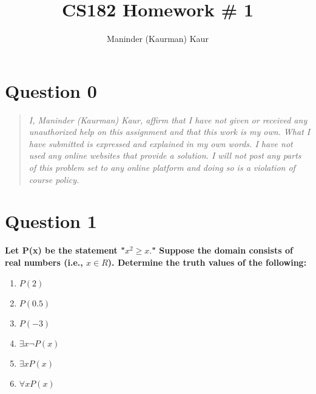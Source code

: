 \documentclass[11pt]{article}
\title{CS182 Homework \# 1}
\author{Maninder (Kaurman) Kaur}
\begin{document}
\maketitle

\section*{Question 0}
\begin{quote}
    \textit{I, Maninder (Kaurman) Kaur, affirm that I have not given or received any unauthorized help on this assignment and that this work is my own. What I have submitted is expressed and explained in my own words. I have not used any online websites that provide a solution. I will not post any parts of this problem set to any online platform and doing so is a violation of course policy.}
\end{quote}

\clearpage
\section*{Question 1}

    \textbf{Let P(x) be the statement "\(x^2 \geq x.\)" Suppose the domain consists of real numbers (i.e., \(x \in R\)). Determine the truth values of the following:}

    \begin{enumerate}[label=(\alph*)]
        \item \(P(2)\)
        \item \(P(0.5)\)
        \item \(P(-3)\)
        \item \(\exists x \neg P(x)\)
        \item \(\exists x P(x)\)
        \item \(\forall x P(x)\)
    \end{enumerate}
\end{document}
